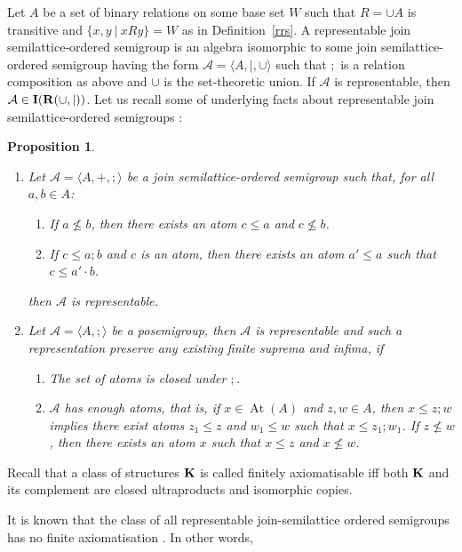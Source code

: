 \documentclass[a4paper]{article}
\theoremstyle{defin}
\theoremstyle{theorem}
\theoremstyle{prop}
\newtheorem{prop}{Proposition}
\theoremstyle{lemma}
\theoremstyle{ex}
\theoremstyle{col}
\theoremstyle{claim}
\begin{document}
Let $A$ be a set of binary relations on some base set $W$ such that $R = \cup A$ is transitive and $\{ x, y \: | \: x R y \} = W$ as in Definition~\ref{rrs}. A representable join semilattice-ordered semigroup is an algebra isomorphic to some join semilattice-ordered semigroup having the form $\mathcal{A} = \langle A, |, \cup \rangle$ such that $;$ is a relation composition as above and $\cup$ is the set-theoretic union. If $\mathcal{A}$ is representable, then $\mathcal{A} \in {\bf I}({\bf R}(\cup, |))$. Let us recall some of underlying facts about representable join semilattice-ordered semigroups \cite{andreka1991representations}:

\begin{prop}
  $ $

  \begin{enumerate}
    \item Let $\mathcal{A} = \langle A, +, ; \rangle$ be a join semilattice-ordered semigroup such that, for all $a, b \in A$:
    \begin{enumerate}
      \item If $a \nleq b$, then there exists an atom $c \leq a$ and $c \nleq b$.
      \item If $c \leq a ; b$ and $c$ is an atom, then there exists an atom $a' \leq a$ such that $c \leq a' \cdot b$.
    \end{enumerate}
    then $\mathcal{A}$ is representable.
    \item Let $\mathcal{A} = \langle A, ; \rangle$ be a posemigroup, then $\mathcal{A}$ is representable and such a representation preserve any existing finite suprema and infima, if
    \begin{enumerate}
      \item The set of atoms is closed under $;$.
      \item $\mathcal{A}$ has enough atoms, that is, if $x \in \operatorname{At}(A)$ and $z, w \in A$, then $x \leq z ; w$ implies there exist atoms $z_1 \leq z$ and $w_1 \leq w$ such that $x \leq z_1 ; w_1$. If $z \nleq w$, then there exists an atom $x$ such that $x \leq z$ and $x \nleq w$.
    \end{enumerate}
  \end{enumerate}
\end{prop}

Recall that a class of structures ${\bf K}$ is called finitely axiomatisable iff both ${\bf K}$ and its complement are closed
ultraproducts and isomorphic copies.

It is known that the class of all representable join-semilattice ordered semigroups has no finite axiomatisation \cite{andreka1989union}. In other words,
\end{document}
